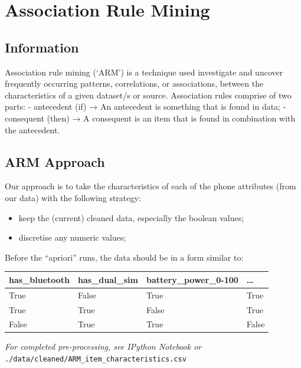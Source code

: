 \documentclass[11pt]{article}
\providecommand{\tightlist}{%
      \setlength{\itemsep}{0pt}\setlength{\parskip}{0pt}}
\begin{document}
    \hypertarget{association-rule-mining}{%
\section{Association Rule Mining}\label{association-rule-mining}}

\hypertarget{information}{%
\subsection{Information}\label{information}}

Association rule mining (`ARM') is a technique used investigate and
uncover frequently occurring patterns, correlations, or associations,
between the characteristics of a given dataset/s or source. Association
rules comprise of two parts: - antecedent (if) → An antecedent is
something that is found in data; - consequent (then) → A consequent is
an item that is found in combination with the antecedent.

    \hypertarget{arm-approach}{%
\subsection{ARM Approach}\label{arm-approach}}

Our approach is to take the characteristics of each of the phone
attributes (from our data) with the following strategy:

\begin{itemize}
\tightlist
\item
  keep the (current) cleaned data, especially the boolean values;
\item
  discretise any numeric values;
\end{itemize}

Before the ``apriori'' runs, the data should be in a form similar to:

\begin{longtable}[]{@{}llll@{}}
\toprule
has\_bluetooth & has\_dual\_sim & battery\_power\_0-100 &
\ldots{}\tabularnewline
\midrule
\endhead
True & False & True & True\tabularnewline
True & True & False & True\tabularnewline
False & True & True & False\tabularnewline
\bottomrule
\end{longtable}

\emph{For completed pre-processing, see IPython Notebook or}
\texttt{./data/cleaned/ARM\_item\_characteristics.csv}
\end{document}
